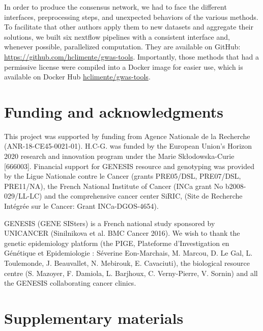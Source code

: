 \documentclass[twocolumn, 10pt]{article}
\begin{document}
In order to produce the consensus network, we had to face the different interfaces, preprocessing steps, and unexpected behaviors of the various methods. To facilitate that other authors apply them to new datasets and aggregate their solutions, we built six nextflow pipelines \cite{di_tommaso_nextflow_2017} with a consistent interface and, whenever possible, parallelized computation. They are available on GitHub: \url{https://github.com/hclimente/gwas-tools}. Importantly, those methods that had a permissive license were compiled into a Docker image for easier use, which is available on Docker Hub \href{https://hub.docker.com/r/hclimente/gwas-tools}{hclimente/gwas-tools}.

\section{Funding and acknowledgments}
\label{sec:org7847920}

This project was supported by funding from Agence Nationale de la Recherche (ANR-18-CE45-0021-01). H.C-G. was funded by the European Union’s Horizon 2020 research and innovation program under the Marie Skłodowska-Curie [666003]. Financial support for GENESIS resource and genotyping was provided by the Ligue Nationale contre le Cancer (grants PRE05/DSL, PRE07/DSL, PRE11/NA), the French National Institute of Cancer (INCa grant No b2008-029/LL-LC) and the comprehensive cancer center SiRIC, (Site de Recherche Intégrée sur le Cancer: Grant INCa-DGOS-4654).

GENESIS (GENE SISters) is a French national study sponsored by UNICANCER (Sinilnikova et al. BMC Cancer 2016). We wish to thank the genetic epidemiology platform (the PIGE, Plateforme d'Investigation en Génétique et Epidemiologie : Séverine Eon-Marchais, M. Marcou, D. Le Gal, L. Toulemonde, J. Beauvallet, N. Mebirouk, E. Cavaciuti), the biological resource centre (S. Mazoyer, F. Damiola, L. Barjhoux, C. Verny-Pierre, V. Sornin) and all the GENESIS collaborating cancer clinics. 




\clearpage
\setcounter{figure}{0}
\setcounter{section}{0}
\setcounter{table}{0}

\section*{Supplementary materials}
\label{sec:org7e6740f}
\end{document}
